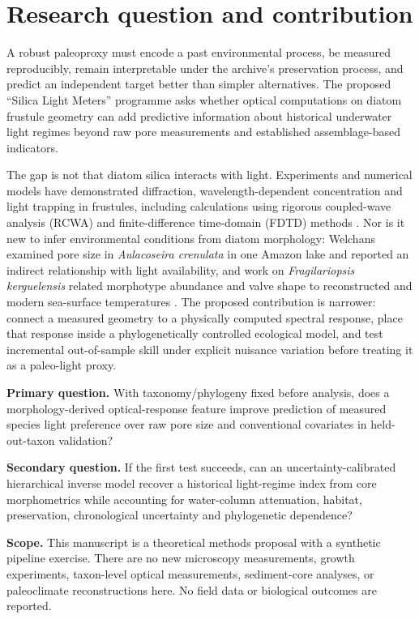 \documentclass[11pt,a4paper]{article}
\begin{document}
\section{Research question and contribution}
A robust paleoproxy must encode a past environmental process, be measured reproducibly, remain interpretable under the archive's preservation process, and predict an independent target better than simpler alternatives. The proposed ``Silica Light Meters'' programme asks whether optical computations on diatom frustule geometry can add predictive information about historical underwater light regimes beyond raw pore measurements and established assemblage-based indicators.

The gap is not that diatom silica interacts with light. Experiments and numerical models have demonstrated diffraction, wavelength-dependent concentration and light trapping in frustules, including calculations using rigorous coupled-wave analysis (RCWA) and finite-difference time-domain (FDTD) methods \citep{ferrara2014,chen2015,romann2015}. Nor is it new to infer environmental conditions from diatom morphology: Welchans examined pore size in \textit{Aulacoseira crenulata} in one Amazon lake and reported an indirect relationship with light availability, and work on \textit{Fragilariopsis kerguelensis} related morphotype abundance and valve shape to reconstructed and modern sea-surface temperatures \citep{welchans2020,kloster2018,glemser2019}. The proposed contribution is narrower: connect a measured geometry to a physically computed spectral response, place that response inside a phylogenetically controlled ecological model, and test incremental out-of-sample skill under explicit nuisance variation before treating it as a paleo-light proxy.

\textbf{Primary question.} With taxonomy/phylogeny fixed before analysis, does a morphology-derived optical-response feature improve prediction of measured species light preference over raw pore size and conventional covariates in held-out-taxon validation?

\textbf{Secondary question.} If the first test succeeds, can an uncertainty-calibrated hierarchical inverse model recover a historical light-regime index from core morphometrics while accounting for water-column attenuation, habitat, preservation, chronological uncertainty and phylogenetic dependence?

\textbf{Scope.} This manuscript is a theoretical methods proposal with a synthetic pipeline exercise. There are no new microscopy measurements, growth experiments, taxon-level optical measurements, sediment-core analyses, or paleoclimate reconstructions here. No field data or biological outcomes are reported.
\end{document}
